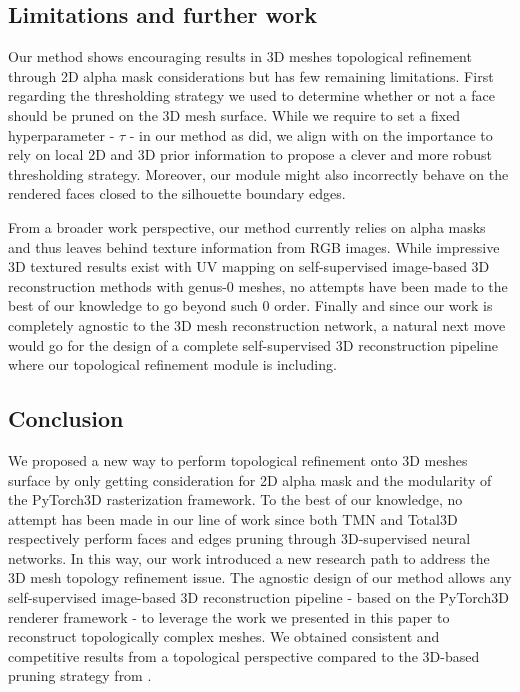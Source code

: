 \subsection{Limitations and further work}



Our method shows encouraging results in 3D meshes topological refinement through 2D alpha mask considerations but has few remaining limitations. First regarding the thresholding strategy we used to determine whether or not a face should be pruned on the 3D mesh surface. While we require to set a fixed hyperparameter - $\tau$ - in our method as \citep{pan2019deep} did, we align with \citep{nie2020total3dunderstanding} on the importance to rely on local 2D and 3D prior information to propose a clever and more robust thresholding strategy. Moreover, our module might also incorrectly behave on the rendered faces closed to the silhouette boundary edges. 

From a broader work perspective, our method currently relies on alpha masks and thus leaves behind texture information from RGB images. While impressive 3D textured results exist with UV mapping on self-supervised image-based 3D reconstruction methods with genus-0 meshes\citep{li2020self,pavllo2020convolutional}, no attempts have been made to the best of our knowledge to go beyond such 0 order. Finally and since our work is completely agnostic to the 3D mesh reconstruction network, a natural next move would go for the design of a complete self-supervised 3D reconstruction pipeline where our topological refinement module is including. 

\subsection{Conclusion}
\label{sec:conclusion}
We proposed a new way to perform topological refinement onto 3D meshes surface by only getting consideration for 2D alpha mask and the modularity of the PyTorch3D rasterization framework. To the best of our knowledge, no attempt has been made in our line of work since both TMN\citep{pan2019deep} and Total3D\citep{nie2020total3dunderstanding} respectively perform faces and edges pruning through 3D-supervised  neural networks. In this way, our work introduced a new research path to address the 3D mesh topology refinement issue. The agnostic design of our method allows any self-supervised image-based 3D reconstruction pipeline - based on the PyTorch3D renderer framework - to leverage the work we presented in this paper to reconstruct topologically complex meshes. We obtained consistent and competitive results from a topological perspective compared to the 3D-based pruning strategy from \citep{pan2019deep}. 








